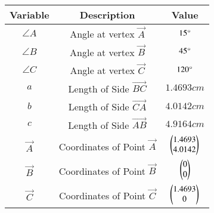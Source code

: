 \begin{tabular}[12pt]{ |c|c|c|}
    \hline
    \textbf{Variable} & \textbf{Description} & \textbf{Value} \\
    \hline
    $\angle A$ & Angle at vertex $\vec{A}$ & $15\degree$ \\
    \hline
	$\angle B$ & Angle at vertex $\vec{B}$ & $45\degree$ \\
    \hline 
	$\angle C$ & Angle at vertex $\vec{C}$ & $120\degree$ \\
    \hline
    $a$ & Length of Side $\vec{BC}$ & $1.4693cm$ \\
    \hline
	$b$ & Length of Side $\vec{CA}$ & $4.0142cm$ \\
    \hline 
	$c$ & Length of Side $\vec{AB}$ & $4.9164cm$ \\
    \hline
    $\vec{A}$ & Coordinates of Point $\vec{A}$ & $\begin{pmatrix}1.4693\\4.0142\end{pmatrix}$ \\
    \hline
    $\vec{B}$ & Coordinates of Point $\vec{B}$ & $\begin{pmatrix}0\\0\end{pmatrix}$ \\
    \hline 
    $\vec{C}$ & Coordinates of Point $\vec{C}$ & $\begin{pmatrix}1.4693\\0\end{pmatrix}$ \\
    \hline


\end{tabular}
